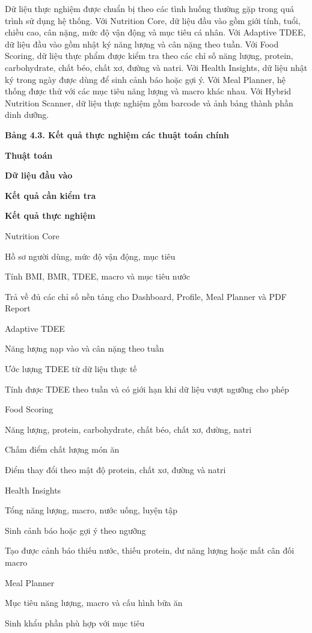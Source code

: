 Dữ liệu thực nghiệm được chuẩn bị theo các tình huống thường gặp trong quá trình sử dụng hệ thống. Với Nutrition Core, dữ liệu đầu vào gồm giới tính, tuổi, chiều cao, cân nặng, mức độ vận động và mục tiêu cá nhân. Với Adaptive TDEE, dữ liệu đầu vào gồm nhật ký năng lượng và cân nặng theo tuần. Với Food Scoring, dữ liệu thực phẩm được kiểm tra theo các chỉ số năng lượng, protein, carbohydrate, chất béo, chất xơ, đường và natri. Với Health Insights, dữ liệu nhật ký trong ngày được dùng để sinh cảnh báo hoặc gợi ý. Với Meal Planner, hệ thống được thử với các mục tiêu năng lượng và macro khác nhau. Với Hybrid Nutrition Scanner, dữ liệu thực nghiệm gồm barcode và ảnh bảng thành phần dinh dưỡng.

\textbf{Bảng 4.3. Kết quả thực nghiệm các thuật toán chính}

\textbf{Thuật toán}

\textbf{Dữ liệu đầu vào}

\textbf{Kết quả cần kiểm tra}

\textbf{Kết quả thực nghiệm}

Nutrition Core

Hồ sơ người dùng, mức độ vận động, mục tiêu

Tính BMI, BMR, TDEE, macro và mục tiêu nước

Trả về đủ các chỉ số nền tảng cho Dashboard, Profile, Meal Planner và PDF Report

Adaptive TDEE

Năng lượng nạp vào và cân nặng theo tuần

Ước lượng TDEE từ dữ liệu thực tế

Tính được TDEE theo tuần và có giới hạn khi dữ liệu vượt ngưỡng cho phép

Food Scoring

Năng lượng, protein, carbohydrate, chất béo, chất xơ, đường, natri

Chấm điểm chất lượng món ăn

Điểm thay đổi theo mật độ protein, chất xơ, đường và natri

Health Insights

Tổng năng lượng, macro, nước uống, luyện tập

Sinh cảnh báo hoặc gợi ý theo ngưỡng

Tạo được cảnh báo thiếu nước, thiếu protein, dư năng lượng hoặc mất cân đối macro

Meal Planner

Mục tiêu năng lượng, macro và cấu hình bữa ăn

Sinh khẩu phần phù hợp với mục tiêu

